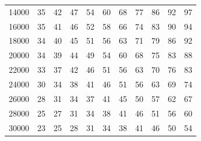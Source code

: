 \documentclass[a4paper, 10pt]{article}
\begin{document}
\begin{table}[!tbp]
\begin{center}
\begin{tabular}{lllllllllll}
14000& 35& 42& 47&\cellcolor{gray90} 54&\cellcolor{gray80} 60&\cellcolor{gray80} 68&\cellcolor{gray70} 77&\cellcolor{gray60} 86&\cellcolor{gray50} 92&\cellcolor{gray50} 97\tabularnewline
16000& 35& 41& 46&\cellcolor{gray90} 52&\cellcolor{gray90} 58&\cellcolor{gray80} 66&\cellcolor{gray70} 74&\cellcolor{gray60} 83&\cellcolor{gray60} 90&\cellcolor{gray50} 94\tabularnewline
18000& 34& 40& 45&\cellcolor{gray90} 51&\cellcolor{gray90} 56&\cellcolor{gray80} 63&\cellcolor{gray70} 71&\cellcolor{gray70} 79&\cellcolor{gray60} 86&\cellcolor{gray50} 92\tabularnewline
20000& 34& 39& 44& 49&\cellcolor{gray90} 54&\cellcolor{gray80} 60&\cellcolor{gray80} 68&\cellcolor{gray70} 75&\cellcolor{gray60} 83&\cellcolor{gray60} 88\tabularnewline
22000& 33& 37& 42& 46&\cellcolor{gray90} 51&\cellcolor{gray90} 56&\cellcolor{gray80} 63&\cellcolor{gray80} 70&\cellcolor{gray70} 76&\cellcolor{gray60} 83\tabularnewline
24000& 30& 34& 38& 41& 46&\cellcolor{gray90} 51&\cellcolor{gray90} 56&\cellcolor{gray80} 63&\cellcolor{gray80} 69&\cellcolor{gray70} 74\tabularnewline
26000& 28& 31& 34& 37& 41& 45&\cellcolor{gray90} 50&\cellcolor{gray90} 57&\cellcolor{gray80} 62&\cellcolor{gray80} 67\tabularnewline
28000& 25& 27& 31& 34& 38& 41& 46&\cellcolor{gray90} 51&\cellcolor{gray90} 56&\cellcolor{gray80} 60\tabularnewline
30000& 23& 25& 28& 31& 34& 38& 41& 46&\cellcolor{gray90} 50&\cellcolor{gray90} 54\tabularnewline
\hline
\end{tabular}
\end{center}
\end{table}
\end{document}
